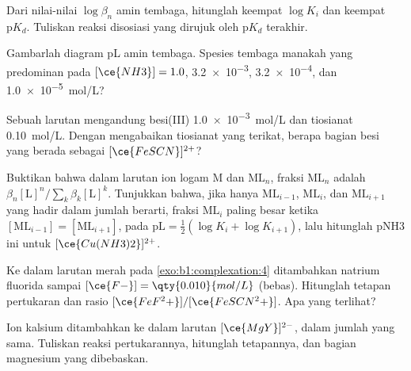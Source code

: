 \begin{exercise}[$\star$]\label{exo:b1:complexation:2}
Dari nilai-nilai $\log\beta_n$  amin tembaga, hitunglah keempat
$\log K_i$ dan keempat $\mathrm{p}K_d$. Tuliskan reaksi disosiasi yang
dirujuk oleh $\mathrm{p}K_d$ terakhir.
\end{exercise}

\begin{exercise}[$\star$]\label{exo:b1:complexation:3}
Gambarlah diagram pL  amin tembaga. Spesies tembaga manakah yang
predominan pada $[\ce{NH3}] = 1.0$, \num{3.2e-3}, \num{3.2e-4}, dan
\qty{1.0e-5}{mol/L}?
\end{exercise}

\begin{exercise}[$\star$]\label{exo:b1:complexation:4}
Sebuah larutan mengandung besi(III) \qty{1.0e-3}{mol/L} dan tiosianat
\qty{0.10}{mol/L}. Dengan mengabaikan tiosianat yang terikat, berapa
bagian besi yang berada sebagai $[\ce{FeSCN}]^{2+}$?
\end{exercise}

\begin{exercise}[$\star\star$]\label{exo:b1:complexation:5}
Buktikan bahwa dalam larutan ion logam M dan 
$\mathrm{ML}_n$, fraksi $\mathrm{ML}_n$ adalah
$\beta_n[\mathrm{L}]^n / \sum_{k} \beta_k[\mathrm{L}]^k$. Tunjukkan
bahwa, jika hanya $\mathrm{ML}_{i-1}$, $\mathrm{ML}_i$, dan
$\mathrm{ML}_{i+1}$ yang hadir dalam jumlah berarti, fraksi
$\mathrm{ML}_i$ paling besar ketika $[\mathrm{ML}_{i-1}] = [\mathrm{ML}_{i+1}]$,
pada $\mathrm{pL} = \frac12(\log K_i + \log K_{i+1})$, lalu hitunglah pNH3
ini untuk $[\ce{Cu(NH3)2}]^{2+}$.
\end{exercise}

\begin{exercise}[$\star\star$]\label{exo:b1:complexation:6}
Ke dalam larutan merah pada \cref{exo:b1:complexation:4} ditambahkan
natrium fluorida sampai $[\ce{F-}] = \qty{0.010}{mol/L}$ (bebas).
Hitunglah tetapan pertukaran  dan rasio
$[\ce{FeF^2+}]/[\ce{FeSCN^2+}]$. Apa yang terlihat?
\end{exercise}

\begin{exercise}[$\star\star$]\label{exo:b1:complexation:7}
Ion kalsium ditambahkan ke dalam larutan $[\ce{MgY}]^{2-}$, dalam jumlah
yang sama. Tuliskan reaksi pertukarannya, hitunglah tetapannya, dan
bagian magnesium yang dibebaskan.
\end{exercise}

